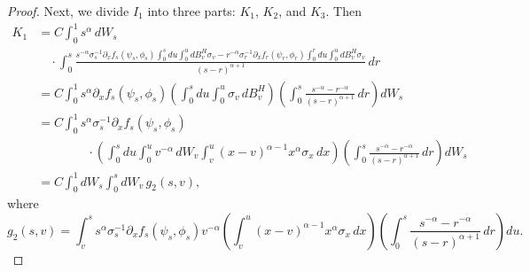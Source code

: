 \documentclass{article}
\theoremstyle{definition}  %
\theoremstyle{plain}  %
\begin{document}
\begin{proof}
Next, we divide \( I_1 \) into three parts: \( K_1 \), \( K_2 \), and \( K_3 \). Then
\begin{align*}
    K_1 &= C \int_0^1 s^\alpha \, dW_s \\
    &\quad \cdot \int_0^s \frac{s^{-\alpha} \sigma_s^{-1} \partial_x f_s(\psi_s, \phi_s) \int_0^s du \int_0^u dB^H_v \sigma_v - r^{-\alpha} \sigma_r^{-1} \partial_x f_r(\psi_r, \phi_r) \int_0^r du \int_0^u dB^H_v \sigma_v}{(s - r)^{\alpha + 1}} \, dr \\
    &= C \int_0^1 s^\alpha \partial_x f_s(\psi_s, \phi_s) \left( \int_0^s du \int_0^u \sigma_v \, dB^H_v \right) \left( \int_0^s \frac{s^{-\alpha} - r^{-\alpha}}{(s - r)^{\alpha + 1}} \, dr \right) dW_s \\
    &= C \int_0^1 s^\alpha \sigma_s^{-1} \partial_x f_s(\psi_s, \phi_s) \\
    &\qquad\qquad \cdot \left( \int_0^s du \int_0^u v^{-\alpha} \, dW_v \int_v^u (x-v)^{\alpha-1} x^\alpha \sigma_x \, dx \right) \left( \int_0^s \frac{s^{-\alpha} - r^{-\alpha}}{(s - r)^{\alpha + 1}} \, dr \right) dW_s \\
    &= C \int_0^1 dW_s \int_0^s dW_v \, g_2(s,v),
\end{align*}
where
\[
    g_2(s,v) = \int_v^s s^\alpha \sigma_s^{-1} \partial_x f_s(\psi_s, \phi_s) v^{-\alpha} \left( \int_v^u (x-v)^{\alpha-1} x^\alpha \sigma_x \, dx \right) \left( \int_0^s \frac{s^{-\alpha} - r^{-\alpha}}{(s - r)^{\alpha + 1}} \, dr \right) du.
\]


\end{proof}
\end{document}

